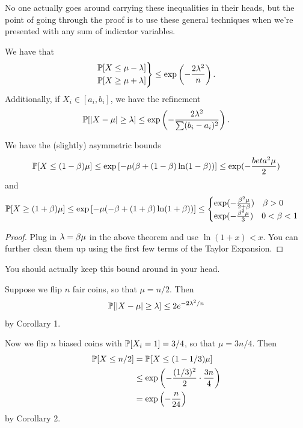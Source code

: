 \documentclass[11 pt]{scrartcl}
\begin{document}
No one actually goes around carrying these inequalities in their heads, but the point of going through the proof is to use these general techniques when we're presented with any sum of indicator variables. 

\begin{corollary}
    We have that 
    \[
\begin{rcases*}
    \PP[X \leq \mu - \la] \\ 
    \PP[X \geq \mu + \la]  
\end{rcases*} \leq \exp\left(-\dfrac{2\la^2}{n}\right)
.\]
    Additionally, if $X_i \in [a_i, b_i]$, we have the refinement  
    \[ \mathbb P[|X-\mu| \geq \lambda] \leq \exp\left(-\dfrac{2\lambda^2}{\sum(b_i-a_i)^2}\right).\] 
\end{corollary}

\begin{corollary}
    We have the (slightly) asymmetric bounds
    \[ \mathbb P[X \leq (1-\beta) \mu] \leq \exp\left[-\mu(\beta + (1-\beta)\ln(1-\beta))\right] \leq \exp(-\frac{beta^2\mu}{2})\] 
    and 
    \[ \mathbb P[X \geq (1+\beta) \mu] \leq \exp\left[-\mu(-\beta + (1+\beta)\ln(1+\beta))\right] \leq \begin{cases}
            \exp(-\frac{\beta^2\mu}{2 + \beta }) \quad \beta > 0 \\ 
            \exp(-\frac{\beta^2\mu}{3}) \quad 0 < \beta < 1
    \end{cases}
    \] 
\end{corollary}
\begin{proof}
    Plug in $\lambda = \beta\mu$ in the above theorem and use $\ln(1+x) < x$. You can further clean them up using the first few terms of the Taylor Expansion.
\end{proof}
You should actually keep this bound around in your head. 

\begin{example}
    Suppose we flip $n$ fair coins, so that $\mu = n/2$. Then 
    \[ \mathbb P[|X-\mu| \geq \lambda] \leq 2e^{-2\lambda^2/n}\] 
    by Corollary 1. 
\end{example}

\begin{example}
    Now we flip $n$ biased coins with $\mathbb P[X_i = 1] = 3/4$, so that $\mu = 3n/4$. Then 
    \begin{align*}
        \mathbb P[X \leq n/2] &= \mathbb P[X \leq (1- 1/3)\mu] \\ 
                        &\leq \exp\left(-\dfrac{(1/3)^2}{2} \cdot \dfrac{3n}{4}\right) \\ 
                        &= \exp\left(-\frac{n}{24}\right)
    \end{align*}
    by Corollary 2. 
\end{example}
\end{document}
